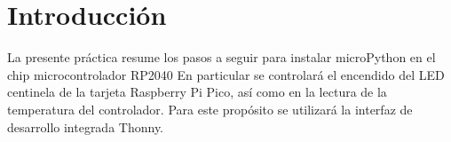 %
%


\section{Introducción}%
\label{sec:introduction}
La presente práctica resume los pasos a seguir para instalar microPython en el chip microcontrolador RP2040
En particular se controlará el encendido del LED centinela de la tarjeta Raspberry Pi Pico, así como en la lectura de la temperatura del controlador.
Para este propósito se utilizará la interfaz de desarrollo integrada Thonny.





